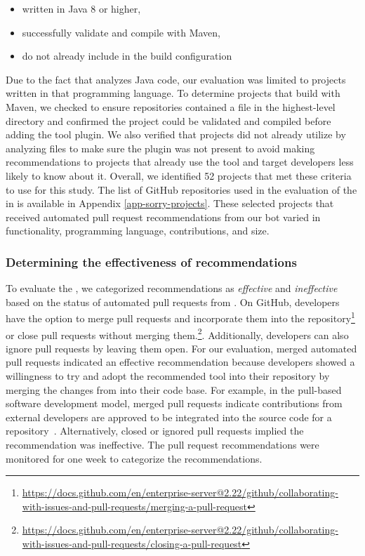 \begin{itemize}[topsep=0pt,itemsep=-1ex,partopsep=1ex,parsep=1ex]
    \item written in Java 8 or higher,
    \item successfully validate and compile with Maven,
    \item do not already include \EP in the build configuration
\end{itemize}

Due to the fact that \EP analyzes Java code, our evaluation was limited to projects written in that programming language. To determine projects that build with Maven, we checked to ensure repositories contained a \pom file in the highest-level directory and confirmed the project could be validated and compiled before adding the tool plugin. We also verified that projects did not already utilize \EP by analyzing \pom files to make sure the \EP plugin was not present to avoid making recommendations to projects that already use the tool and target developers less likely to know about it. Overall, we identified 52 projects that met these criteria to use for this study. The list of GitHub repositories used in the evaluation of the \tele in \toolone is available in Appendix \ref{app-sorry-projects}. These selected projects that received automated pull request recommendations from our bot varied in functionality, programming language, contributions, and size. 

\subsubsection{Determining the effectiveness of \tele recommendations}

To evaluate the \tele, we categorized recommendations as \textit{effective} and \textit{ineffective} based on the status of automated pull requests from \toolone. On GitHub, developers have the option to merge pull requests and incorporate them into the repository\footnote{\url{https://docs.github.com/en/enterprise-server@2.22/github/collaborating-with-issues-and-pull-requests/merging-a-pull-request}} or close pull requests without merging them.\footnote{\url{https://docs.github.com/en/enterprise-server@2.22/github/collaborating-with-issues-and-pull-requests/closing-a-pull-request}}. Additionally, developers can also ignore pull requests by leaving them open. For our evaluation, merged automated pull requests indicated an effective recommendation because developers showed a willingness to try \EP and adopt the recommended tool into their repository by merging the changes from \toolone into their code base. For example, in the pull-based software development model, merged pull requests indicate contributions from external developers are approved to be integrated into the source code for a repository~\cite{gousios2014exploratory}. Alternatively, closed or ignored pull requests implied the recommendation was ineffective. The \tele pull request recommendations were monitored for one week to categorize the recommendations. 

